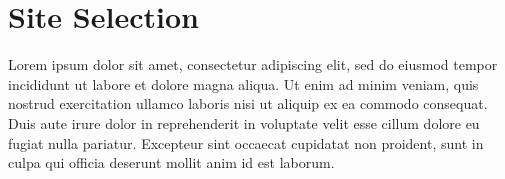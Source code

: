 \documentclass[a4paper,12pt]{report}
\begin{document}
\section[Site Selection]{Site Selection}
Lorem ipsum dolor sit amet, consectetur adipiscing elit, sed do eiusmod tempor incididunt ut labore et dolore magna aliqua. Ut enim ad minim veniam, quis nostrud exercitation ullamco laboris nisi ut aliquip ex ea commodo consequat. Duis aute irure dolor in reprehenderit in voluptate velit esse cillum dolore eu fugiat nulla pariatur. Excepteur sint occaecat cupidatat non proident, sunt in culpa qui officia deserunt mollit anim id est laborum.
\newpage

\nocite{*}
\printbibliography[title={References}]
\thispagestyle{fancy}
\end{document}
